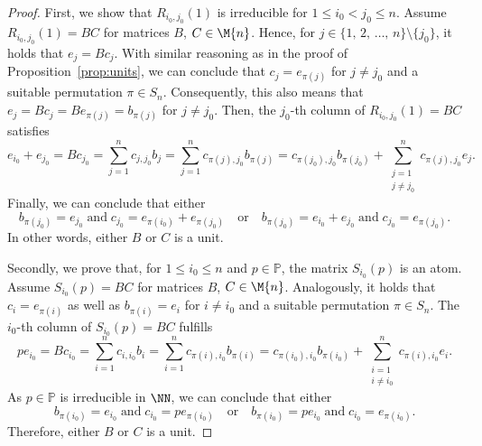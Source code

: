 \begin{proof}
First, we show that $R_{i_0,j_0}(1)$ is irreducible for $1 \leq i_0 < j_0 \leq n$. Assume $R_{i_0,j_0}(1) =BC$ for matrices $B$, $C \in \M{n}$. Hence, for $j \in \{ 1, \, 2, \, \dots, \, n \} \setminus \{ j_0 \}$, it holds that $e_j=Bc_j $. With similar reasoning as in the proof of Proposition~\ref{prop:units}, we can conclude that $c_j = e_{\pi(j)}$ for $j \neq j_0$ and a suitable permutation $\pi \in S_n$. Consequently, this also means that $e_j = Bc_j = Be_{\pi(j)} = b_{\pi(j)}$ for $j \neq j_0$. Then, the $j_0$-th column of $R_{i_0,j_0}(1) =BC$ satisfies
\[ e_{i_0} + e_{j_0} = Bc_{j_0} = \sum_{j=1}^n c_{j,j_0}b_{j} = \sum_{j=1}^n c_{\pi(j),j_0}b_{\pi(j)} = c_{\pi(j_0),j_0}b_{\pi(j_0)}  + \sum_{\substack{j=1 \\ j \neq j_0}}^n c_{\pi(j),j_0}e_{j}. \]
Finally, we can conclude that either 
\[ b_{\pi(j_0)} = e_{j_0}\;\text{and}\;c_{j_0} =e_{\pi(i_0)} + e_{\pi(j_0)}\quad\text{or}\quad b_{\pi(j_0)} = e_{i_0} + e_{j_0} \;\text{and}\;c_{j_0} = e_{\pi(j_0)}.\]
In other words, either $B$ or $C$ is a unit.

Secondly, we prove that, for $1 \leq i_0 \leq n$ and $p \in \mathbb{P}$, the matrix $S_{i_0}(p)$ is an atom. Assume $S_{i_0}(p) =BC$ for matrices $B$, $C \in \M{n}$. Analogously, it holds that $c_i = e_{\pi(i)}$ as well as $b_{\pi(i)} = e_i$ for $i \neq i_0$ and a suitable permutation $\pi \in S_n$. The $i_0$-th column of $S_{i_0}(p) =BC$ fulfills
\[ pe_{i_0} = Bc_{i_0} = \sum_{i=1}^n c_{i,i_0}b_{i} = \sum_{i=1}^n c_{\pi(i),i_0}b_{\pi(i)} = c_{\pi(i_0),i_0}b_{\pi(i_0)}  + \sum_{\substack{i=1 \\ i \neq i_0}}^n c_{\pi(i),i_0}e_{i}. \]
As $p \in \mathbb{P}$ is irreducible in $\NN$, we can conclude that either
\[ b_{\pi(i_0)} = e_{i_0} \; \text{and} \; c_{i_0} = pe_{\pi(i_0)} \quad \text{or} \quad b_{\pi(i_0)} = pe_{i_0} \; \text{and} \; c_{i_0} = e_{\pi(i_0)}.\]
Therefore, either $B$ or $C$ is a unit.


\end{proof}
